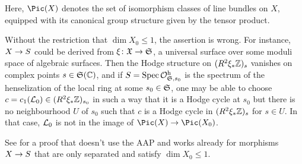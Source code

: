 \documentclass[a4paper, 10pt, oneside, DIV=9, chapterprefix=true, numbers=enddot, bibliography=totoc]{scrbook}
\begin{document}
\begin{rem}
	\begin{alphanumerate}
		\item Here, $\Pic(X)$ denotes the set of isomorphism classes of line bundles on $X$, equipped with its canonical group structure given by the tensor product.
		\item Without the restriction that $\dim X_0\leq 1$, the assertion is wrong. For instance, $X\morphism S$ could be derived from $\xi\colon \XX\morphism \SS$, a universal surface over some moduli space of algebraic surfaces. Then the Hodge structure on $(R^2\xi_*\mathbb{Z})_s$ vanishes on complex points $s\in\mathfrak{S}(\mathbb{C})$, and if $S=\operatorname{Spec} \mathcal{O}_{\mathfrak{S},s_0}^{\mathrm{h}}$ is the spectrum of the henselization of the local ring at some $s_0\in\mathfrak{S}$, one may be able to choose $c=c_1(\mathcal{L}_0)\in (R^2\xi_*\mathbb{Z})_{s_0}$ in such a way that it is a Hodge cycle at $s_0$ but there is no neighbourhood $U$ of $s_0$ such that $c$ is a Hodge cycle in $(R^2\xi_*\mathbb{Z})_s$ for $s\in U$. In that case, $\mathcal{L}_0$ is not in the image of $\Pic(X)\morphism\Pic(X_0)$.
		\item See \cite[Arcata~IV Prop.]{sga4.5} for a proof that doesn't use the AAP and works already for morphisms $X\morphism S$ that are only separated and satisfy $\dim X_0\leq 1$.
	\end{alphanumerate}
\end{rem}
\end{document}
